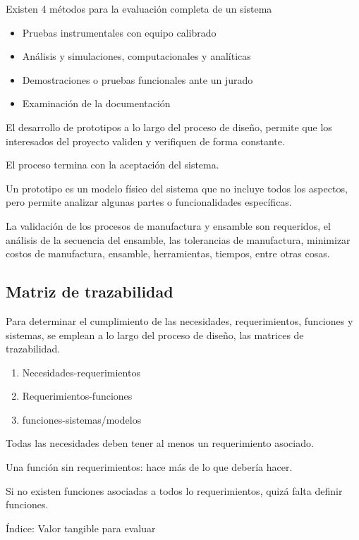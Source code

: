 Existen 4 métodos para la evaluación completa de un sistema
\begin{itemize}
    \item Pruebas instrumentales con equipo calibrado
    \item Análisis y simulaciones, computacionales y analíticas
    \item Demostraciones o pruebas funcionales ante un jurado
    \item Examinación de la documentación 
\end{itemize}

El desarrollo de prototipos a lo largo del proceso de diseño, permite que los interesados del proyecto validen y verifiquen de forma constante.

El proceso termina con la aceptación del sistema.

Un prototipo es un modelo físico del sistema que no incluye todos los aspectos, pero permite analizar algunas partes o funcionalidades específicas.  

La validación de los procesos de manufactura y ensamble son requeridos, el análisis de la secuencia del ensamble, las tolerancias de manufactura, minimizar costos de manufactura, ensamble, herramientas, tiempos, entre otras cosas.

\subsection{Matriz de trazabilidad}

Para determinar el cumplimiento de las necesidades, requerimientos, funciones y sistemas, se emplean a lo largo del proceso de diseño, las matrices de trazabilidad. 
\begin{enumerate}
    \item Necesidades-requerimientos
    \item Requerimientos-funciones
    \item funciones-sistemas/modelos
\end{enumerate}

Todas las necesidades deben tener al menos un requerimiento asociado.

Una función sin requerimientos: hace más de lo que debería hacer.

Si no existen funciones asociadas a todos lo requerimientos, quizá falta definir funciones. 

Índice: Valor tangible para evaluar